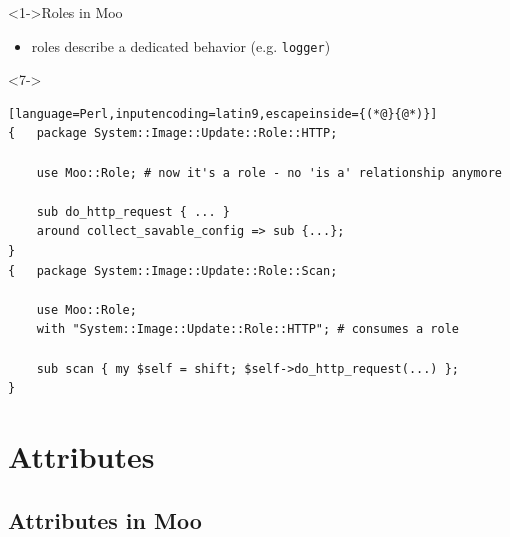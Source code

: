 \documentclass[ngerman,xcolor={table,dvipsnames},smaller,compress,hyperref={bookmarks,colorlinks}]{beamer}%
\begin{document}
\begin{frame}[t,fragile]

\begin{block}<1->{Roles in Moo}
\begin{itemize}
\item roles describe a dedicated behavior (e.g. \texttt{logger})
\end{itemize}
\end{block}

\begin{block}<7->{}
\scriptsize
\begin{lstlisting}[language=Perl,inputencoding=latin9,escapeinside={(*@}{@*)}]
{   package System::Image::Update::Role::HTTP;

    use Moo::Role; # now it's a role - no 'is a' relationship anymore

    sub do_http_request { ... }
    around collect_savable_config => sub {...};
}
{   package System::Image::Update::Role::Scan;

    use Moo::Role;
    with "System::Image::Update::Role::HTTP"; # consumes a role

    sub scan { my $self = shift; $self->do_http_request(...) };
}
\end{lstlisting}
\end{block}

\end{frame}

\section{Attributes}

\subsection{Attributes in Moo}
\end{document}
